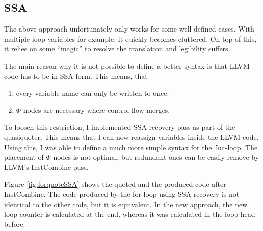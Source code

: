 \documentclass[a4paper,bibliography=totocnumbered,parskip,headsepline]{scrbook}
\begin{document}
\subsection{SSA}
The above approach unfortunately only works for some well-defined cases.
With multiple loop-variables for example, it quickly becomes cluttered.
On top of this, it relies on some ``magic'' to resolve the translation and legibility suffers.

The main reason why it is not possible to define a better syntax is that LLVM code has to be in SSA form.
This means, that
\begin{enumerate}[noitemsep]
 \item every variable name can only be written to once.
 \item $\Phi$-nodes are necessary where control flow merges.
\end{enumerate}

To loosen this restriction, I implemented SSA recovery pass as part of the quasiquoter.
This means that I can now reassign variables inside the LLVM code.
Using this, I was able to define a much more simple syntax for the \lstinline{for}-loop.
The placement of $\Phi$-nodes is not optimal, but redundant ones can be easily remove by LLVM's InstCombine pass.

Figure \ref{fig:forquoteSSA} shows the quoted and the produced code after InstCombine.
The code produced by the for loop using SSA recovery is not identical to the other code, but it is equivalent.
In the new approach, the new loop counter is calculated at the end, whereas it was calculated in the loop head before.
\end{document}
